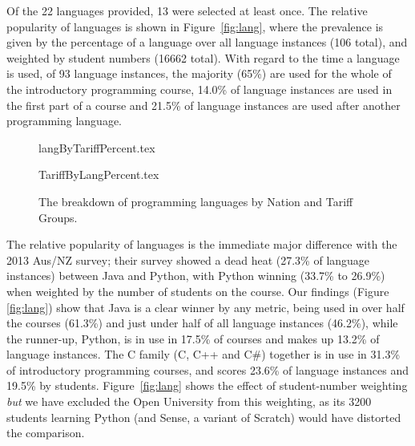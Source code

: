 \documentclass{sig-alternate}
\begin{document}
Of the 22 languages provided, 13 were selected at least once. The
relative popularity of languages is shown in Figure~\ref{fig:lang},
where the prevalence is given by the percentage of a language over all
language instances (106 total), and weighted by student numbers (16662
total). With regard to the time a language is used, of 93
language instances, the majority (65\%) are used for the whole of the
introductory programming course, 14.0\% of language instances are used
in the first part of a course and 21.5\% of language instances are
used after another programming language.


\begin{figure}[ht]
\begin{center}
{langByTariffPercent.tex}
\end{center}%
%
\begin{center}
{TariffByLangPercent.tex}
\end{center}\vskip-18pt
\caption{The breakdown of programming languages by Nation and Tariff Groups.\label{fig;LangTariff}}
\end{figure}

The relative popularity of languages is the immediate major difference
with the 2013 Aus/NZ survey; their survey showed a dead heat (27.3\%
of language instances) between Java and Python, with Python winning
(33.7\% to 26.9\%) when weighted by the number of students on the
course.  Our findings (Figure \ref{fig:lang}) show that Java is a
clear winner by any metric, being used in over half the courses
(61.3\%) and just under half of all language instances (46.2\%), while
the runner-up, Python, is in use in 17.5\% of courses and makes up
13.2\% of language instances. The C family (C, C++ and C\#) together
is in use in 31.3\% of introductory programming courses, and scores
23.6\% of language instances and 19.5\% by
students. Figure~\ref{fig:lang} shows the effect of student-number
weighting \emph{but} we have excluded the Open University from this
weighting, as its 3200 students learning Python (and Sense, a variant
of Scratch) would have distorted the comparison.
\end{document}
